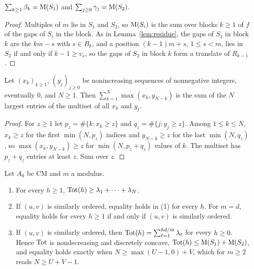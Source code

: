 \begin{lemma}\label{lem:spectrum-mass}
$\sum_{k\ge1}\beta_k=\operatorname{M}(S_1)$ and $\sum_{j\ge0}\gamma_j=\operatorname{M}(S_2)$.
\end{lemma}

\begin{proof}
Multiples of $m$ lie in $S_1$ and $S_2$, so $\operatorname{M}(S_i)$ is the sum over blocks $k\ge1$ of $f$ of the gaps of $S_i$ in the block. As in Lemma~\ref{lem:residue}, the gaps of $S_1$ in block $k$ are the $km-s$ with $s\in B_k$, and a position $(k-1)m+s$, $1\le s<m$, lies in $S_2$ if and only if $k-1\ge v_s$, so the gaps of $S_2$ in block $k$ form a translate of $R_{k-1}$.
\end{proof}

\begin{lemma}[Merge]\label{lem:merge}
Let $(x_k)_{k\ge1}$, $(y_j)_{j\ge0}$ be nonincreasing sequences of nonnegative integers, eventually $0$, and $N\ge1$. Then $\sum_{k=1}^{N}\max(x_k,y_{N-k})$ is the sum of the $N$ largest entries of the multiset of all $x_k$ and $y_j$.
\end{lemma}

\begin{proof}
For $z\ge1$ let $p_z=\#\{k:x_k\ge z\}$ and $q_z=\#\{j:y_j\ge z\}$. Among $1\le k\le N$, $x_k\ge z$ for the first $\min(N,p_z)$ indices and $y_{N-k}\ge z$ for the last $\min(N,q_z)$, so $\max(x_k,y_{N-k})\ge z$ for $\min(N,p_z+q_z)$ values of $k$. The multiset has $p_z+q_z$ entries at least $z$. Sum over $z$.
\end{proof}

\begin{theorem}[Spectrum]\label{thm:spectrum}
Let $A_0$ be CM and $m$ a modulus.
\begin{enumerate}
\item For every $h\ge1$, $\operatorname{Tot}(h)\ge\lambda_1+\dots+\lambda_N$.
\item If $(u,v)$ is similarly ordered, equality holds in (1) for every $h$. For $m=d$, equality holds for every $h\ge1$ if and only if $(u,v)$ is similarly ordered.
\item If $(u,v)$ is similarly ordered, then $\operatorname{Tot}(h)=\sum_{\ell=1}^{hd/m}\lambda_\ell$ for every $h\ge0$. Hence $\operatorname{Tot}$ is nondecreasing and discretely concave, $\operatorname{Tot}(h)\le\operatorname{M}(S_1)+\operatorname{M}(S_2)$, and equality holds exactly when $N\ge\max(U-1,0)+V$, which for $m\ge2$ reads $N\ge U+V-1$.
\end{enumerate}
\end{theorem}

